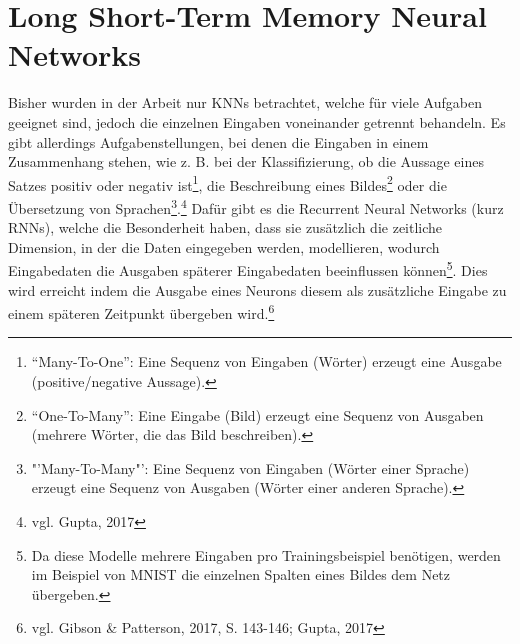 \documentclass[
	a4paper,
	12pt,
	ngerman,
	oneside
]{scrreprt}											%
\newcommand{\practitioner}[1]{vgl. Gibson \& Patterson, 2017, S. {#1}}
\begin{document}
	\chapter{Long Short-Term Memory Neural Networks}\label{LSTM Kapitel}
		Bisher wurden in der Arbeit nur KNNs betrachtet, welche für viele Aufgaben geeignet sind, jedoch die einzelnen Eingaben voneinander getrennt behandeln. Es gibt allerdings Aufgabenstellungen, bei denen die Eingaben in einem Zusammenhang stehen, wie z. B. bei der Klassifizierung, ob die Aussage eines Satzes positiv oder negativ ist\footnote{"`Many-To-One"': Eine Sequenz von Eingaben (Wörter) erzeugt eine Ausgabe (positive/negative Aussage).}, die Beschreibung eines Bildes\footnote{"`One-To-Many"': Eine Eingabe (Bild) erzeugt eine Sequenz von Ausgaben (mehrere Wörter, die das Bild beschreiben).} oder die Übersetzung von Sprachen\footnote{"'Many-To-Many"': Eine Sequenz von Eingaben (Wörter einer Sprache) erzeugt eine Sequenz von Ausgaben (Wörter einer anderen Sprache).}.\footnote{vgl. Gupta, 2017} Dafür gibt es die Recurrent Neural Networks (kurz RNNs), welche die Besonderheit haben, dass sie zusätzlich die zeitliche Dimension, in der die Daten eingegeben werden, modellieren, wodurch Eingabedaten die Ausgaben späterer Eingabedaten beeinflussen können\footnote{Da diese Modelle mehrere Eingaben pro Trainingsbeispiel benötigen, werden im Beispiel von MNIST die einzelnen Spalten eines Bildes dem Netz übergeben.}. Dies wird erreicht indem die Ausgabe eines Neurons diesem als zusätzliche Eingabe zu einem späteren Zeitpunkt übergeben wird.\footnote{\practitioner{143-146; Gupta, 2017}} \\
		
\end{document}
